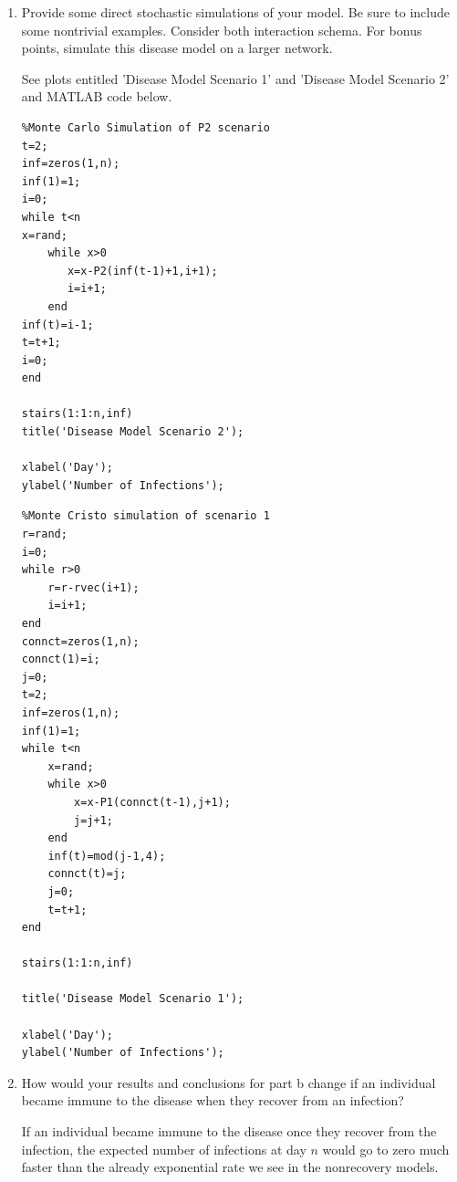 \documentclass[12pt]{article}
\numberwithin{equation}{section}
\begin{document}
\begin{enumerate}
\begin{enumerate}
\begin{lstlisting}
%Expected Value of P1 using weighted sums%
prob1=eye(16);
expect1=zeros(1,n);
for i=1:n
    prob1=prob1*P1;
    vec=rvec*prob1;
    expect1(i)=0*vec(1)+vec(2)+2*vec(3)+3*vec(4)+0*vec(5)+vec(6)+2*vec(7)
               +3*vec(8)+0*vec(9)+vec(10)+2*vec(11)+3*vec(12)+0*vec(13)
               +vec(14)+2*vec(15)+3*vec(16);
end
plot(1:n,expect1);
title('Expected Number of Infections at Day n: Scenario 1,p=.3,q=.15,r=.6')
xlabel('Day')
ylabel('Expected Number of Infections')
\end{lstlisting}

\item Provide some direct stochastic simulations of your model. Be sure to include some nontrivial examples. Consider both interaction schema. For bonus points, simulate this disease model on a larger network.

See plots entitled 'Disease Model Scenario 1' and 'Disease Model Scenario 2' and MATLAB code below.

\begin{lstlisting}
%Monte Carlo Simulation of P2 scenario
t=2;
inf=zeros(1,n);
inf(1)=1;
i=0;
while t<n
x=rand;
    while x>0
       x=x-P2(inf(t-1)+1,i+1);
       i=i+1;
    end
inf(t)=i-1;    
t=t+1;
i=0;
end

stairs(1:1:n,inf)
title('Disease Model Scenario 2');

xlabel('Day');
ylabel('Number of Infections');
\end{lstlisting}

\begin{lstlisting}
%Monte Cristo simulation of scenario 1
r=rand;
i=0;
while r>0
    r=r-rvec(i+1);
    i=i+1;
end
connct=zeros(1,n);
connct(1)=i;
j=0;
t=2;
inf=zeros(1,n);
inf(1)=1;
while t<n
    x=rand;
    while x>0
        x=x-P1(connct(t-1),j+1);
        j=j+1;
    end
    inf(t)=mod(j-1,4);
    connct(t)=j;
    j=0;
    t=t+1;
end

stairs(1:1:n,inf)

title('Disease Model Scenario 1');

xlabel('Day');
ylabel('Number of Infections');
\end{lstlisting}

\item How would your results and conclusions for part b change if an individual became immune to the disease when they recover from an infection?

If an individual became immune to the disease once they recover from the infection, the expected number of infections at day $n$ would go to zero much faster than the already exponential rate we see in the nonrecovery models. 


\end{enumerate}
\end{enumerate}
\end{document}
